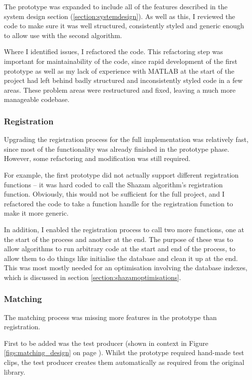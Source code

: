 \documentclass[12pt,a4paper,twoside,openright]{report}
\begin{document}
The prototype was expanded to include all of the features described in the system design section (\ref{section:systemdesign}). As well as this, I reviewed the code to make sure it was well structured, consistently styled and generic enough to allow use with the second algorithm. 

Where I identified issues, I refactored the code. This refactoring step was important for maintainability of the code, since rapid development of the first prototype as well as my lack of experience with MATLAB at the start of the project had left behind badly structured and inconsistently styled code in a few areas. These problem areas were restructured and fixed, leaving a much more manageable codebase.


\subsubsection{Registration}

Upgrading the registration process for the full implementation was relatively fast, since most of the functionality was already finished in the prototype phase. However, some refactoring and modification was still required.

For example, the first prototype did not actually support different registration functions -- it was hard coded to call the Shazam algorithm's registration function. Obviously, this would not be sufficient for the full project, and I refactored the code to take a function handle for the registration function to make it more generic.

In addition, I enabled the registration process to call two more functions, one at the start of the process and another at the end. The purpose of these was to allow algorithms to run arbitrary code at the start and end of the process, to allow them to do things like initialise the database and clean it up at the end. This was most mostly needed for an optimisation involving the database indexes, which is discussed in section \ref{section:shazamoptimisations}.

\subsubsection{Matching}

The matching process was missing more features in the prototype than registration.

First to be added was the test producer (shown in context in Figure \ref{figs:matching_design} on page \pageref{figs:matching_design}). Whilst the prototype required hand-made test clips, the test producer creates them automatically as required from the original library.
\end{document}

